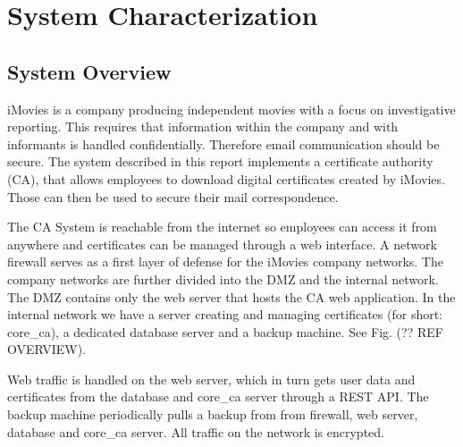 \documentclass[english]{article}
\begin{document}
\section{System Characterization}

\subsection{System Overview}



iMovies is a company producing independent movies with a focus on investigative reporting. This requires that information within the company and with informants is handled confidentially. Therefore email communication should be secure. 
The system described in this report implements a certificate authority (CA), that allows employees to download digital certificates created by iMovies. Those can then be used to secure their mail correspondence. 

The CA System is reachable from the internet so employees can access it from anywhere and certificates can be managed through a web interface. A network firewall serves as a first layer of defense for the iMovies company networks. The company networks are further divided into the DMZ and the internal network. The DMZ contains only the web server that hosts the CA web application. In the internal network we have a server creating and managing certificates (for short: core\_ca), a dedicated database server and a backup machine. See Fig. (?? REF OVERVIEW). 

Web traffic is handled on the web server, which in turn gets user data and certificates from the database and core\_ca server through a REST API. The backup machine periodically pulls a backup from from firewall, web server, database and core\_ca server. All traffic on the network is encrypted.
\end{document}
